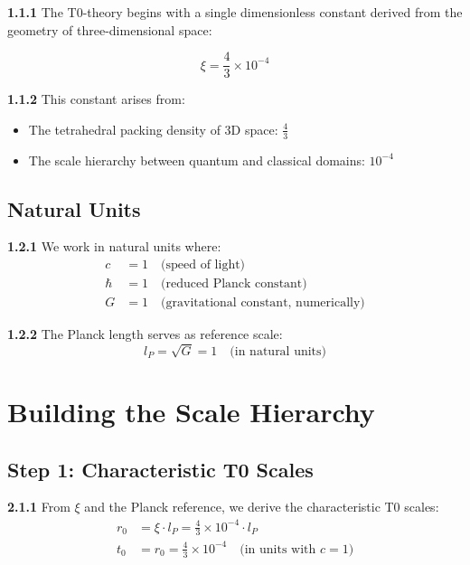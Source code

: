 \documentclass[12pt,a4paper]{article}
\newcommand{\lP}{l_P}
\newcommand{\rzero}{r_0}
\newcommand{\tzero}{t_0}
\newcommand{\xipar}{\xi}
\begin{document}
	\noindent \textbf{1.1.1} The T0-theory begins with a single dimensionless constant derived from the geometry of three-dimensional space:
	
	\begin{keyresult}
		\begin{equation}
			\boxed{\xipar = \frac{4}{3} \times 10^{-4}}
		\end{equation}
	\end{keyresult}
	
	\noindent \textbf{1.1.2} This constant arises from:
	\begin{itemize}
		\item The tetrahedral packing density of 3D space: $\frac{4}{3}$
		\item The scale hierarchy between quantum and classical domains: $10^{-4}$
	\end{itemize}
	
	\subsection{Natural Units}
	
	\noindent \textbf{1.2.1} We work in natural units where:
	\begin{align}
		c &= 1 \quad \text{(speed of light)} \\
		\hbar &= 1 \quad \text{(reduced Planck constant)} \\
		G &= 1 \quad \text{(gravitational constant, numerically)}
	\end{align}
	
	\noindent \textbf{1.2.2} The Planck length serves as reference scale:
	\begin{equation}
		\lP = \sqrt{G} = 1 \quad \text{(in natural units)}
	\end{equation}
	
	\section{Building the Scale Hierarchy}
	
	\subsection{Step 1: Characteristic T0 Scales}
	
	\noindent \textbf{2.1.1} From $\xipar$ and the Planck reference, we derive the characteristic T0 scales:
	\begin{align}
		\rzero &= \xipar \cdot \lP = \frac{4}{3} \times 10^{-4} \cdot \lP \\
		\tzero &= \rzero = \frac{4}{3} \times 10^{-4} \quad \text{(in units with } c=1\text{)}
	\end{align}
	
\end{document}
